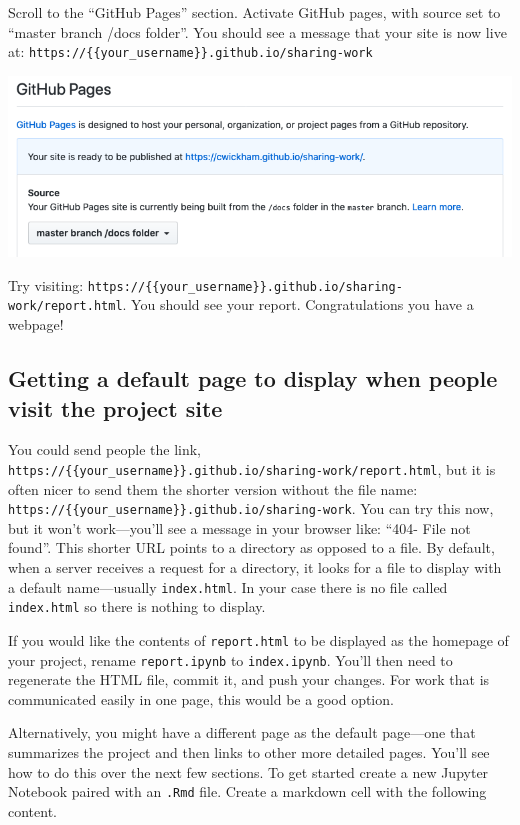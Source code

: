 \documentclass[]{Nemilov}
\begin{document}
Scroll to the ``GitHub Pages'' section.
Activate GitHub pages,
with source set to ``master branch /docs folder''.
You should see a message that your site is now live at:
\texttt{https://\{\{your\_username\}\}.github.io/sharing-work}

\includegraphics{figures/r-publishing/github-pages.png}

Try visiting:
\texttt{https://\{\{your\_username\}\}.github.io/sharing-work/report.html}.
You should see your report.
Congratulations you have a webpage!

\hypertarget{getting-a-default-page-to-display-when-people-visit-the-project-site}{%
\subsection{Getting a default page to display when people visit the project site}\label{getting-a-default-page-to-display-when-people-visit-the-project-site}}

You could send people the link,
\texttt{https://\{\{your\_username\}\}.github.io/sharing-work/report.html},
but it is often nicer to send them the shorter version without the file name:
\texttt{https://\{\{your\_username\}\}.github.io/sharing-work}.
You can try this now,
but it won't work---you'll see a message in your browser like:
``404- File not found''.
This shorter URL points to a directory as opposed to a file.
By default,
when a server receives a request for a directory,
it looks for a file to display with a default name---usually \texttt{index.html}.
In your case there is no file called \texttt{index.html} so there is nothing to display.

If you would like the contents of \texttt{report.html} to be displayed as the homepage of your project,
rename \texttt{report.ipynb} to \texttt{index.ipynb}.
You'll then need to regenerate the HTML file,
commit it,
and push your changes.
For work that is communicated easily in one page,
this would be a good option.

Alternatively,
you might have a different page as the default page---one that summarizes
the project and then links to other more detailed pages.
You'll see how to do this over the next few sections.
To get started create a new Jupyter Notebook paired with an \texttt{.Rmd} file.
Create a markdown cell with the following content.
\end{document}
